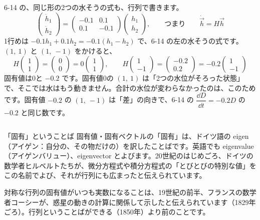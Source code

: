 6-14 の、同じ形の2つの水そうの式も、行列で書きます。
\[ \begin{pmatrix}\dot h_1\\\dot h_2\end{pmatrix}=\begin{pmatrix}-0.1&0.1\\0.1&-0.1\end{pmatrix}\begin{pmatrix}h_1\\h_2\end{pmatrix},\qquad\text{つまり}\qquad \dot{\vec h}=H\vec h \]
1行めは $-0.1h_1+0.1h_2=-0.1(h_1-h_2)$ で、6-14 の左の水そうの式です。$(1,\ 1)$ と $(1,\ -1)$ をかけると、
\[ H\begin{pmatrix}1\\1\end{pmatrix}=\begin{pmatrix}0\\0\end{pmatrix}=0\begin{pmatrix}1\\1\end{pmatrix},\qquad H\begin{pmatrix}1\\-1\end{pmatrix}=\begin{pmatrix}-0.2\\0.2\end{pmatrix}=-0.2\begin{pmatrix}1\\-1\end{pmatrix} \]
固有値は0と $-0.2$ です。固有値0の $(1,\ 1)$ は「2つの水位がそろった状態」で、そこでは水はもう動きません。合計の水位が変わらなかったのは、このためです。固有値 $-0.2$ の $(1,\ -1)$ は「差」の向きで、6-14 の $\dfrac{\dd D}{\dd t}=-0.2D$ の $-0.2$ と同じ数です。

\begin{column}{「固有」ということば}
固有値・固有ベクトルの「固有」は、ドイツ語の eigen（アイゲン：自分の、その物だけの）を訳したことばです。英語でも eigenvalue（アイゲンバリュー）、eigenvector とよびます。20世紀のはじめごろ、ドイツの数学者ヒルベルトたちが、微分方程式や積分方程式の「とびとびの特別な値」をこの名前でよび、それが行列にも広まったと伝えられています。

対称な行列の固有値がいつも実数になることは、19世紀の前半、フランスの数学者コーシーが、惑星の動きの計算に関係して示したと伝えられています（1829年ごろ）。行列ということばができる（1850年）より前のことです。
\end{column}

